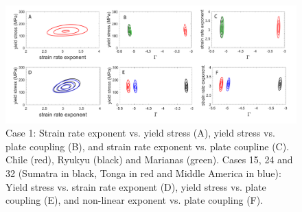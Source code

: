 \documentclass[12pt]{article}
\newcommand{\mgnote}[1]{\textcolor{magenta}{MG: #1}}
\begin{document}
{%
%
%






\begin{figure}[H]
\centering

\includegraphics[scale=0.35]{figure7new.pdf}%

\caption{Case 1:  
Strain rate exponent vs. yield stress (A),  
yield stress vs. plate coupling (B), and 
strain rate exponent vs. plate coupline (C). Chile (red), Ryukyu (black) and Marianas (green).
Cases 15, 24 and 32
 (Sumatra in black, Tonga in red and Middle America in blue):
Yield stress vs. strain rate exponent (D),
yield stress vs. plate coupling (E),
 and non-linear exponent vs. plate coupling (F).
}
\label{fig:distrib}
\end{figure}



}
\end{document}
